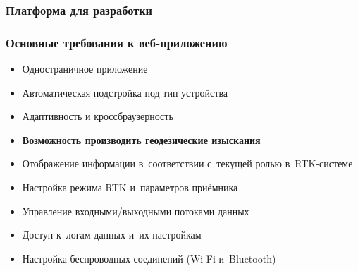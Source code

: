 \documentclass[xetex,с,aspectratio=169]{beamer}
\begin{document}
%
%
{

  \begin{frame}
    \frametitle{Платформа для разработки}
  \end{frame}
}

%
%
\begin{frame}
  \frametitle{Основные требования к веб-приложению}
  
  \large
  
  \begin{itemize}
    \setlength\itemsep{0.5em}
    \item Одностраничное приложение
    \item Автоматическая подстройка под тип устройства
    \item Адаптивность и кроссбраузерность
  \end{itemize}
  \begin{center}
    \vskip -0.7cm
    \color{ifmoblue}{\rule{.5\textwidth}{0.5pt}}
  \end{center}
  \vskip -0.5cm
  \begin{itemize}
    \setlength\itemsep{0.5em}
    \item \textbf{Возможность производить геодезические изыскания}
    \item Отображение информации в~соответствии с~текущей ролью в~RTK-системе
    \item Настройка режима RTK и~параметров приёмника
    \item Управление входными/выходными потоками данных
    \item Доступ к~логам данных и~их настройкам
    \item Настройка беспроводных соединений (Wi-Fi и~Bluetooth)
  \end{itemize}
\end{frame}
\end{document}
